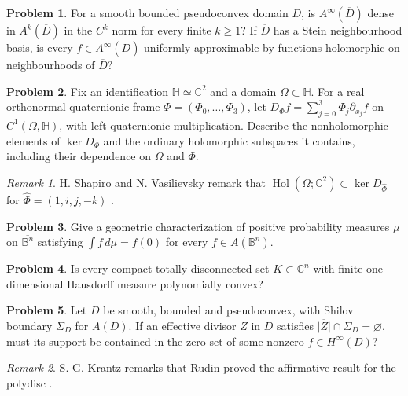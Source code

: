 \documentclass[11pt,reqno]{amsart}
\theoremstyle{definition}
\newtheorem{problem}{Problem}[section]
\theoremstyle{remark}
\newtheorem*{remark}{Remark}
\begin{document}
\begin{problem}\label{b95-5-1-1}\label{b95-5-1-2}
For a smooth bounded pseudoconvex domain $D$, is $A^\infty(\overline D)$ dense in $A^k(\overline D)$ in the $C^k$ norm for every finite $k\geq1$? If $\overline D$ has a Stein neighbourhood basis, is every $f\in A^\infty(\overline D)$ uniformly approximable by functions holomorphic on neighbourhoods of $\overline D$?
\end{problem}


\begin{problem}\label{b95-5-3-1}
Fix an identification $\mathbb H\simeq\mathbb C^2$ and a domain $\Omega\subset\mathbb H$. For a real orthonormal quaternionic frame $\Phi=(\Phi_0,\ldots,\Phi_3)$, let
$D_\Phi f=\sum_{j=0}^3\Phi_j\partial_{x_j}f$
on $C^1(\Omega,\mathbb H)$, with left quaternionic multiplication. Describe the nonholomorphic elements of $\ker D_\Phi$ and the ordinary holomorphic subspaces it contains, including their dependence on $\Omega$ and $\Phi$.
\end{problem}
\begin{remark}
H. Shapiro and N. Vasilievsky remark that $\operatorname{Hol}(\Omega;\mathbb C^2)\subset\ker D_{\widehat\Phi}$ for $\widehat\Phi=(1,i,j,-k)$ \cite[Problem~5.3.1, 1995]{B95}.
\end{remark}

\begin{problem}\label{b95-5-5-1}
Give a geometric characterization of positive probability measures $\mu$ on $\overline{\mathbb B^n}$ satisfying
$\int f\,d\mu=f(0)$ for every $f\in A(\mathbb B^n)$.
\end{problem}


\begin{problem}\label{b95-5-5-2}
Is every compact totally disconnected set $K\subset\mathbb C^n$ with finite one-dimensional Hausdorff measure polynomially convex?
\end{problem}


\begin{problem}\label{b95-5-6-1}
Let $D$ be smooth, bounded and pseudoconvex, with Shilov boundary $\Sigma_D$ for $A(D)$. If an effective divisor $Z$ in $D$ satisfies $\overline{|Z|}\cap\Sigma_D=\varnothing$, must its support be contained in the zero set of some nonzero $f\in H^\infty(D)$?
\end{problem}
\begin{remark}
S. G. Krantz remarks that Rudin proved the affirmative result for the polydisc \cite[Problem~5.6.1, 1995]{B95}.
\end{remark}
\end{document}

